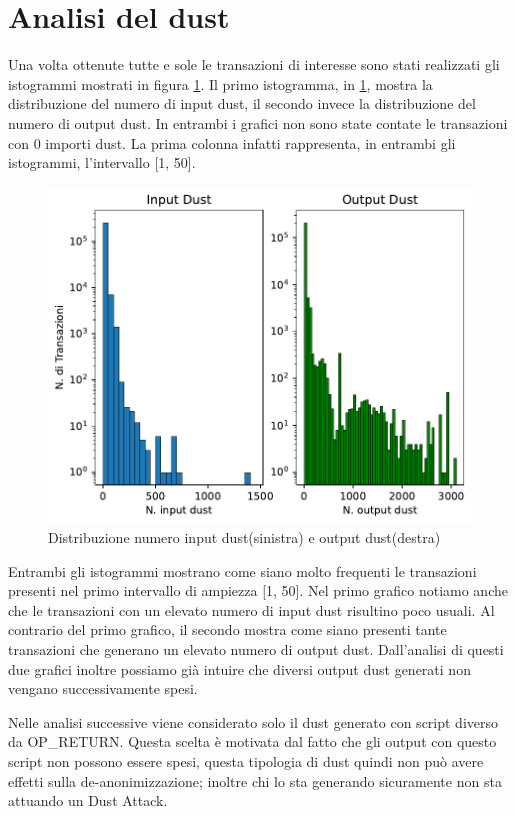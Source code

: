 \section{Analisi del dust}
Una volta ottenute tutte e sole le transazioni di interesse sono stati realizzati gli istogrammi mostrati in figura \ref{fig:dust_distribuzione}. Il primo istogramma, in \ref{fig:dust_distribuzione}, mostra la distribuzione del numero di input dust, il secondo invece la distribuzione del numero di output dust. In entrambi i grafici non sono state contate le transazioni con 0 importi dust. La prima colonna infatti rappresenta, in entrambi gli istogrammi, l'intervallo [1, 50].
\begin{figure}[h!]
    \centering
    \includegraphics[scale=0.9]{Grafici/distribuzione_dust.pdf}
    \caption{Distribuzione numero input dust(sinistra) e output dust(destra)}
    \label{fig:dust_distribuzione}
\end{figure}
\FloatBarrier 
Entrambi gli istogrammi mostrano come siano molto frequenti le transazioni presenti nel primo intervallo di ampiezza [1, 50]. Nel primo grafico notiamo anche che le transazioni con un elevato numero di input dust risultino poco usuali. Al contrario del primo grafico, il secondo mostra come siano presenti tante transazioni che generano un elevato numero di output dust. Dall'analisi di questi due grafici inoltre possiamo già intuire che diversi output dust generati non vengano successivamente spesi.

Nelle analisi successive viene considerato solo il dust generato con script diverso da OP\_RETURN. Questa scelta è motivata dal fatto che gli output con questo script non possono essere spesi, questa tipologia di dust quindi non può avere effetti sulla de-anonimizzazione; inoltre chi lo sta generando sicuramente non sta attuando un Dust Attack.

